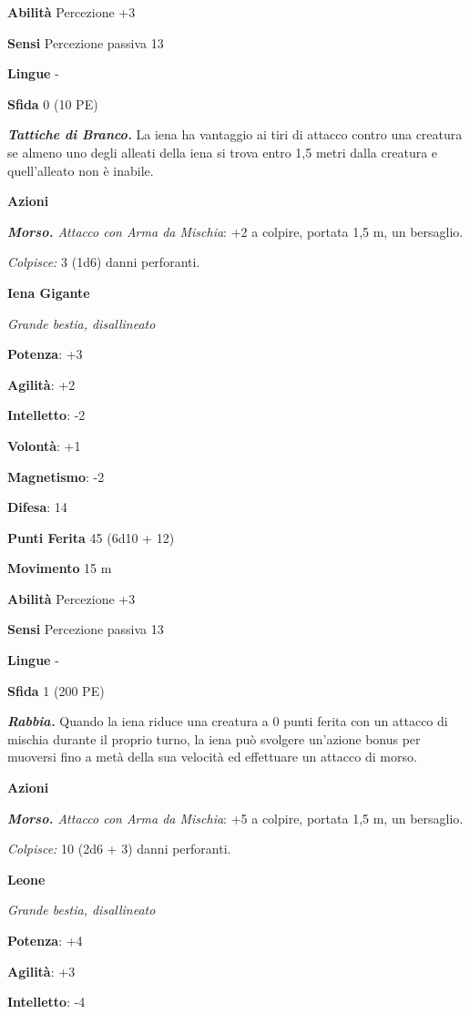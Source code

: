 \begin{multicols}{2}
\textbf{Abilità} Percezione +3

\textbf{Sensi} Percezione passiva 13

\textbf{Lingue} -

\textbf{Sfida} 0 (10 PE)

\emph{\textbf{Tattiche di Branco.}} La iena ha vantaggio ai tiri di
attacco contro una creatura se almeno uno degli alleati della iena si
trova entro 1,5 metri dalla creatura e quell'alleato non è inabile.

\textbf{Azioni}

\emph{\textbf{Morso.} Attacco con Arma da Mischia}: +2 a colpire,
portata 1,5 m, un bersaglio.

\emph{Colpisce:} 3 (1d6) danni perforanti.

\textbf{Iena Gigante}

\emph{Grande bestia, disallineato}

\textbf{Potenza}: +3

\textbf{Agilità}: +2

\textbf{Intelletto}: -2

\textbf{Volontà}: +1

\textbf{Magnetismo}: -2

\textbf{Difesa}: 14

\textbf{Punti Ferita} 45 (6d10 + 12)

\textbf{Movimento} 15 m

\textbf{Abilità} Percezione +3

\textbf{Sensi} Percezione passiva 13

\textbf{Lingue} -

\textbf{Sfida} 1 (200 PE)

\emph{\textbf{Rabbia.}} Quando la iena riduce una creatura a 0 punti
ferita con un attacco di mischia durante il proprio turno, la iena può
svolgere un'azione bonus per muoversi fino a metà della sua velocità ed
effettuare un attacco di morso.

\textbf{Azioni}

\emph{\textbf{Morso.} Attacco con Arma da Mischia}: +5 a colpire,
portata 1,5 m, un bersaglio.

\emph{Colpisce:} 10 (2d6 + 3) danni perforanti.



\textbf{Leone}

\emph{Grande bestia, disallineato}

\textbf{Potenza}: +4

\textbf{Agilità}: +3

\textbf{Intelletto}: -4


\end{multicols}
